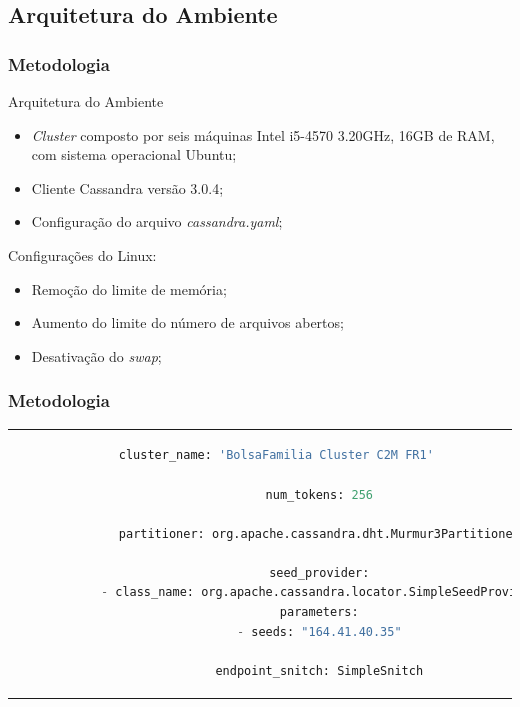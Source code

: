 \documentclass[brazil]{beamer}
\begin{document}
\subsection{Arquitetura do Ambiente}
\begin{frame}
	\frametitle{Metodologia}

	\begin{block}{Arquitetura do Ambiente}
		\begin{itemize}
			\item \emph{Cluster} composto por seis máquinas Intel i5-4570 3.20GHz, 16GB de RAM, com sistema operacional Ubuntu;
			\item Cliente Cassandra versão 3.0.4;
			\item Configuração do arquivo \emph{cassandra.yaml};
		\end{itemize}
	
		Configurações do Linux:
		\begin{itemize}
			\item Remoção do limite de memória;
			\item Aumento do limite do número de arquivos abertos;
			\item Desativação do \emph{swap};
		\end{itemize}
	\end{block}
\end{frame}	

\begin{frame}[fragile]
	\frametitle{Metodologia}
		\begin{tabular}{c}
			\begin{lstlisting}[caption={Configuração cassandra.yaml},language=python]
			cluster_name: 'BolsaFamilia Cluster C2M FR1'
			
			num_tokens: 256
			
			partitioner: org.apache.cassandra.dht.Murmur3Partitioner
			
			seed_provider:
			- class_name: org.apache.cassandra.locator.SimpleSeedProvider
			parameters:
			- seeds: "164.41.40.35"
			
			endpoint_snitch: SimpleSnitch
			\end{lstlisting}
		\end{tabular}
\end{frame}
\end{document}
